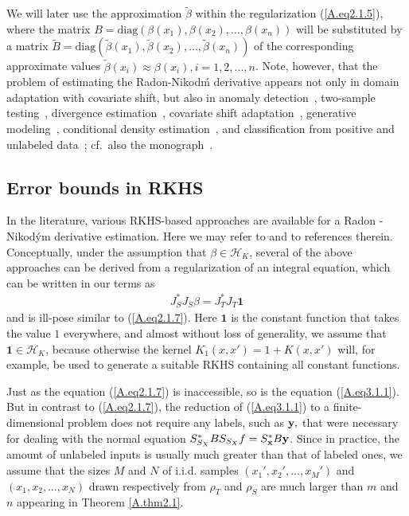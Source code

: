 \documentclass[USenglish]{article}
\newcommand{\x}{{\bf x}}
\newcommand{\hk}{{\mathcal{H}_K}}
\begin{document}
We will later use the approximation $ \tilde{\beta}$ within the regularization (\ref{A.eq2.1.5}), where the matrix $B = \mathrm{diag}( \beta (x_1),\beta (x_2),\ldots,\beta (x_n))$ will be substituted by a matrix $\tilde{B} = \mathrm{diag}(\tilde{\beta} (x_1),\tilde{\beta} (x_2),\ldots,\tilde{\beta} (x_n))$ of the corresponding approximate values $\tilde{\beta} (x_i) \approx \beta (x_i), i=1,2,...,n$.
Note, however, that the problem of estimating the Radon-Nikod\'m derivative appears not only in domain adaptation with covariate shift, but also in anomaly detection~\cite{smola2009relative,hido2011statistical}, two-sample testing~\cite{keziou2005test,kanamori2011f}, divergence estimation~\cite{nguyen2007estimating,nguyen2010}, covariate shift adaptation~\cite{shimodaira2000,gizewski2022regularization,dinu2022aggregation}, generative modeling~\cite{mohamed2016learning}, conditional density estimation~\cite{schuster2020}, and  classification from
positive and unlabeled data~\cite{kato2019learning}; cf.~also the monograph~\cite{sugiyama2012book}.


\subsection{Error bounds in RKHS}
In the literature, various RKHS-based approaches are available for a Radon - Nikod\'ym derivative estimation. Here we may refer to \cite{kanamori2012} and to references therein. Conceptually, under the assumption that $\beta \in \hk$, several of the above approaches can be derived from a regularization of an integral equation, which can be written in our terms as 
	\begin{align}\label{A.eq3.1.1}
	J_S^* J_S \beta = J_T^*J_T \mathbf{1} 
	\end{align}
and is ill-pose similar to (\ref{A.eq2.1.7}). Here $\mathbf{1}$ is the constant function that takes the value $1$ everywhere, and almost without loss of generality, we assume that $\mathbf{1} \in {\mathcal{H}_K}$, because otherwise the kernel $K_1 (x, x') = 1 + K(x,x')$ will, for example, be used to generate a suitable RKHS containing all constant functions.

Just as the equation (\ref{A.eq2.1.7}) is inaccessible, so is the equation (\ref{A.eq3.1.1}). But in contrast  to (\ref{A.eq2.1.7}), the reduction of (\ref{A.eq3.1.1}) to a finite-dimensional problem does not require any labels, such as ${\bf y},$ that were necessary for dealing with the normal equation $S_{S_X}^* B S_{S_X}f = S^*_{{\x}} B {\bf y}$. Since in practice, the amount of unlabeled inputs is usually much greater than that of labeled ones, we assume that the sizes $M$ and $N$ of i.i.d. samples $(x_1',x_2',\ldots,x_M')$ and $(x_1,x_2,\ldots,x_N)$ drawn respectively from $\rho_T$ and $\rho_S$ are much larger than $m$ and $n$ appearing in Theorem \ref{A.thm2.1}.
	
\end{document}
